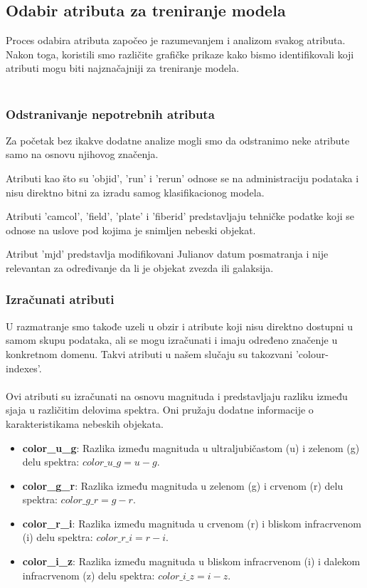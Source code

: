 \documentclass[a4paper,12pt]{article}
\begin{document}
\clearpage
\subsection{Odabir atributa za treniranje modela}

Proces odabira atributa započeo je razumevanjem i analizom svakog atributa. Nakon toga, koristili smo različite grafičke prikaze kako bismo identifikovali koji atributi mogu biti najznačajniji za treniranje modela.\\\\

\subsubsection{Odstranivanje nepotrebnih atributa}

Za početak bez ikakve dodatne analize mogli smo da odstranimo neke atribute samo na osnovu njihovog značenja.

\noindent Atributi kao što su 'objid', 'run' i 'rerun' odnose se na administraciju podataka i nisu direktno bitni za izradu samog klasifikacionog modela.

\noindent Atributi 'camcol', 'field', 'plate' i 'fiberid' predstavljaju tehničke podatke koji se odnose na uslove pod kojima je snimljen nebeski objekat.

\noindent Atribut 'mjd' predstavlja modifikovani Julianov datum posmatranja i nije relevantan za određivanje da li je objekat zvezda ili galaksija.

\subsubsection{Izračunati atributi}

U razmatranje smo takođe uzeli u obzir i atribute koji nisu direktno dostupni u samom skupu podataka, ali se mogu izračunati i imaju određeno značenje u konkretnom domenu. Takvi atributi u našem slučaju su takozvani 'colour-indexes'.
\\\\Ovi atributi su izračunati na osnovu magnituda i predstavljaju razliku između sjaja u različitim delovima spektra. Oni pružaju dodatne informacije o karakteristikama nebeskih objekata.
        \begin{itemize}
            \item \textbf{color\_u\_g}: Razlika između magnituda u ultraljubičastom (u) i zelenom (g) delu spektra: $color\_u\_g = u - g$.
            \item \textbf{color\_g\_r}: Razlika između magnituda u zelenom (g) i crvenom (r) delu spektra: $color\_g\_r = g - r$.
            \item \textbf{color\_r\_i}: Razlika između magnituda u crvenom (r) i bliskom infracrvenom (i) delu spektra: $color\_r\_i = r - i$.
            \item \textbf{color\_i\_z}: Razlika između magnituda u bliskom infracrvenom (i) i dalekom infracrvenom (z) delu spektra: $color\_i\_z = i - z$.
        \end{itemize}
\end{document}
